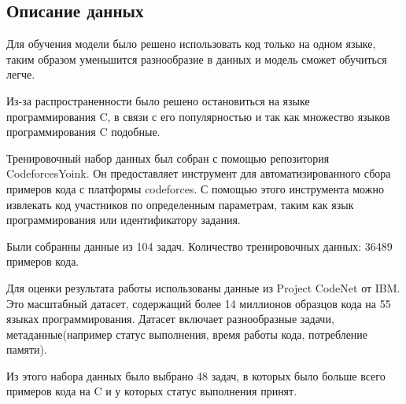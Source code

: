 \documentclass[../part_2.tex]{subfiles}
\begin{document}
    \subsection{Описание данных}
    \par Для обучения модели было решено использовать код только на одном языке, таким образом уменьшится разнообразие в данных и модель сможет обучиться легче.
    \par Из-за распространенности было решено остановиться на языке программирования C, в связи с его популярностью и так как множество языков программирования C подобные.
    \par Тренировочный набор данных был собран с помощью репозитория CodeforcesYoink\cite{codeforcesyoink}. Он предоставляет инструмент для автоматизированного сбора примеров кода с платформы codeforces. С помощью этого инструмента можно извлекать код участников по определенным параметрам, таким как язык программирования или идентификатору задания.
    \par Были собранны данные из 104 задач. Количество тренировочных данных: 36489 примеров кода.
    \par Для оценки результата работы использованы данные из Project CodeNet\cite{puri2021codenetlargescaleaicode} от IBM. Это масштабный датасет, содержащий более 14 миллионов образцов кода на 55 языках программирования. Датасет включает разнообразные задачи, метаданные(например статус выполнения, время работы кода, потребление памяти).
    \par Из этого набора данных было выбрано 48 задач, в которых было больше всего примеров кода на C и у которых статус выполнения принят.
\end{document}
